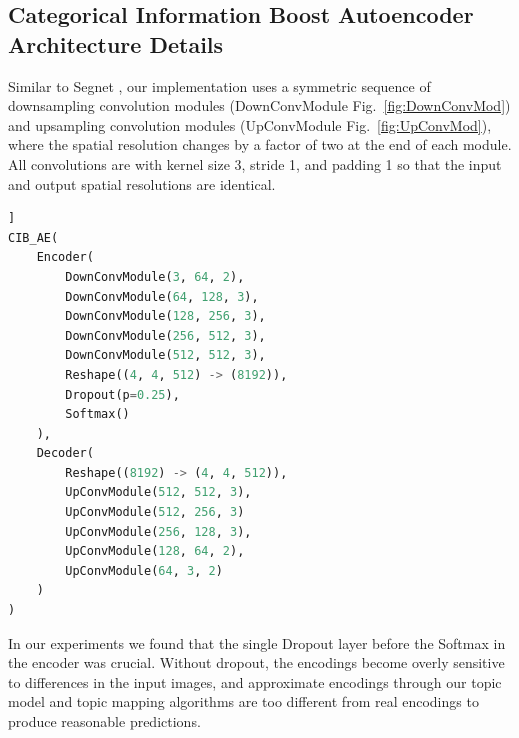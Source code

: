 \begin{appendices}
\chapter{Categorical Information Boost Autoencoder Architecture Details} \label{ch:cibae-arch}
Similar to Segnet \citep{BadrinarayananK15}, our implementation uses a symmetric sequence of downsampling convolution modules (DownConvModule Fig.~\ref{fig:DownConvMod}) and upsampling convolution modules (UpConvModule Fig.~\ref{fig:UpConvMod}), where the spatial resolution changes by a factor of two at the end of each module. All convolutions are with kernel size 3, stride 1, and padding 1 so that the input and output spatial resolutions are identical.

\begin{lstlisting}[language=Python, caption=CIB-AE Architecture Detail, label=cibae_arch]]
CIB_AE(
    Encoder(
        DownConvModule(3, 64, 2),
        DownConvModule(64, 128, 3),
        DownConvModule(128, 256, 3),
        DownConvModule(256, 512, 3),
        DownConvModule(512, 512, 3),
        Reshape((4, 4, 512) -> (8192)),
        Dropout(p=0.25),
        Softmax()
    ), 
    Decoder(
        Reshape((8192) -> (4, 4, 512)),
        UpConvModule(512, 512, 3),
        UpConvModule(512, 256, 3)
        UpConvModule(256, 128, 3),
        UpConvModule(128, 64, 2),
        UpConvModule(64, 3, 2)
    )
)
\end{lstlisting}

In our experiments we found that the single Dropout layer before the Softmax in the encoder was crucial. Without dropout, the encodings become overly sensitive to differences in the input images, and approximate encodings through our topic model and topic mapping algorithms are too different from real encodings to produce reasonable predictions.


\end{appendices}
